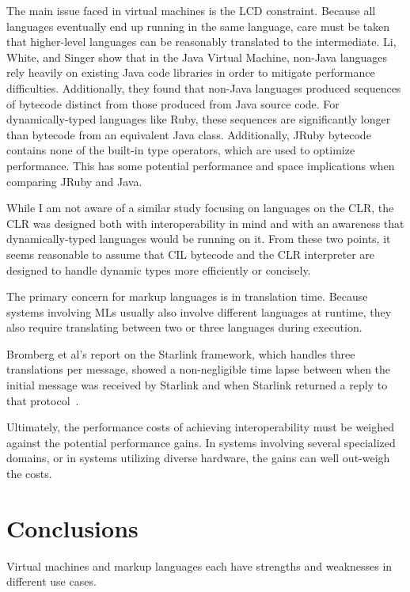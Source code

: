 \documentclass{sig-alternate}
\begin{document}
The main issue faced in virtual machines is the LCD constraint. Because all languages eventually end up running in the same language, care must be taken that higher-level languages can be reasonably translated to the intermediate.
Li, White, and Singer \cite{Li:2013} show that in the Java Virtual Machine, non-Java languages rely heavily on existing Java code libraries in order to mitigate performance difficulties. Additionally, they found that non-Java languages produced sequences of bytecode distinct from those produced from Java source code.
For dynamically-typed languages like Ruby, these sequences are significantly longer than bytecode from an equivalent Java class. Additionally, JRuby bytecode contains none of the built-in type operators, which are used to optimize performance. This has some potential performance and space implications when comparing JRuby and Java.


While I am not aware of a similar study focusing on languages on the CLR, the CLR was designed both with interoperability in mind and with an awareness that dynamically-typed languages would be running on it. From these two points, it seems reasonable to assume that CIL bytecode and the CLR interpreter are designed to handle dynamic types more efficiently or concisely.


The primary concern for markup languages is in translation time. Because systems involving MLs usually also involve different languages at runtime, they also require translating between two or three languages during execution.

Bromberg et al's report on the Starlink framework, which handles three translations per message, showed a non-negligible time lapse between when the initial message was received by Starlink and when Starlink returned a reply to that protocol~\cite{Bromberg:2011}.

Ultimately, the performance costs of achieving interoperability must be weighed against the potential performance gains. In systems involving several specialized domains, or in systems utilizing diverse hardware, the gains can well out-weigh the costs.



\section{Conclusions}


Virtual machines and markup languages each have strengths and weaknesses in different use cases.
\end{document}
